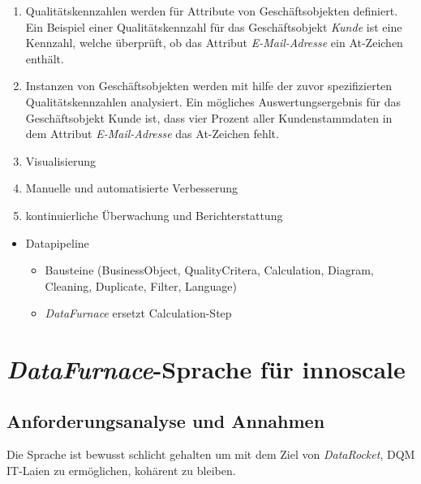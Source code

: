 \documentclass[
  language=german, %
  type=bachelor%
]{isthesis}
\begin{document}
\begin{content}
\begin{enumerate}
		\item Qualitätskennzahlen werden für Attribute von Geschäftsobjekten definiert. Ein
		Beispiel einer Qualitätskennzahl für das Geschäftsobjekt \textit{Kunde} ist
		eine Kennzahl, welche überprüft, ob das Attribut \textit{E-Mail-Adresse}
		ein At-Zeichen enthält.

		\item Instanzen von Geschäftsobjekten werden mit hilfe der zuvor
		spezifizierten Qualitätskennzahlen analysiert. Ein mögliches
		Auswertungsergebnis für das Geschäftsobjekt Kunde ist, dass vier Prozent
		aller Kundenstammdaten in dem Attribut \textit{E-Mail-Adresse} das
		At-Zeichen fehlt.

		\item Visualisierung
		\item Manuelle und automatisierte Verbesserung
		\item kontinuierliche Überwachung und Berichterstattung
	\end{enumerate}


\label{sec:Vorstellung-DataRocket}
  \begin{itemize}
    \item Datapipeline
      \begin{itemize}
        \item Bausteine (BusinessObject, QualityCritera, Calculation, Diagram,
          Cleaning, Duplicate, Filter, Language)
        \item \textit{DataFurnace} ersetzt Calculation-Step
      \end{itemize}
  \end{itemize}


  \chapter{\textit{DataFurnace}-Sprache für innoscale}


  \section{Anforderungsanalyse und Annahmen}
  Die Sprache ist bewusst schlicht gehalten um mit dem Ziel von \textit{DataRocket},
  \acrshort{DQM} IT-Laien zu ermöglichen, kohärent zu bleiben.


\end{content}
\end{document}
